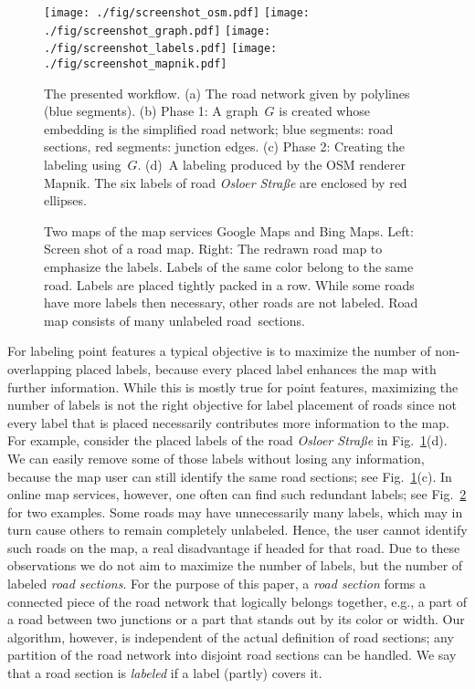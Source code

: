 \documentclass[a4paper,11pt]{article}
\begin{document}
\begin{figure}[t]
\centering
\texttt{[image: ./fig/screenshot\_osm.pdf]}
\texttt{[image: ./fig/screenshot\_graph.pdf]}
\texttt{[image: ./fig/screenshot\_labels.pdf]}
\texttt{[image: ./fig/screenshot\_mapnik.pdf]}
\caption{The presented workflow. (a) The road network given by
  polylines (blue segments). (b) Phase 1:
  A graph~$G$ is created whose embedding is the simplified road
  network; blue segments: road sections, red segments: junction
  edges. (c) Phase 2: Creating the
  labeling using~$G$. (d)~A labeling produced
  by the OSM renderer Mapnik. The six labels of road \emph{Osloer Straße} are enclosed by red ellipses. }
\label{fig:motivation}
\end{figure}


\begin{figure}[t]
\centering
{}
\caption{Two maps of the map services Google Maps and Bing Maps. Left: Screen shot of a road map. Right: The redrawn road map to emphasize the labels. Labels of the same color belong to the same road.  Labels are placed tightly packed in a row. While some roads have more labels then necessary, other roads are not labeled.  Road map consists of many unlabeled road~sections.}
\label{fig:webservices}
\end{figure}


For labeling point features a typical objective is to maximize the
number of non-overlapping placed labels, because every placed label
enhances the map with further information. While this is mostly
true for point features, maximizing the number of labels is not the
right objective for label placement of roads since not every label
that is placed necessarily contributes more information to the
map. For example, consider the placed labels of the road \emph{Osloer Straße}
in Fig.~\ref{fig:motivation}(d).  We can
easily remove some of those labels without losing any information,
because the map user can still identify the same road sections; see
Fig.~\ref{fig:motivation}(c). In online map services,
however, one often can find such redundant labels; see
Fig.~\ref{fig:webservices} for two examples.  Some
roads may have unnecessarily many labels, which may in turn cause others to remain completely
unlabeled. Hence, the user
cannot identify such roads on the map, a real disadvantage if headed
for that road.  Due to these observations we do not aim to maximize
the number of labels, but the number of labeled \emph{road
  sections}. For the purpose of this paper, a \emph{road section}
forms a connected piece of the road network that logically belongs together,
e.g., a part of a road between two junctions or a part that stands out
by its color or width. Our algorithm, however, is independent of the actual definition of road sections; any partition of the road network into disjoint road sections can be handled. We say that a road section is \emph{labeled}
if a label (partly) covers it.
\end{document}
